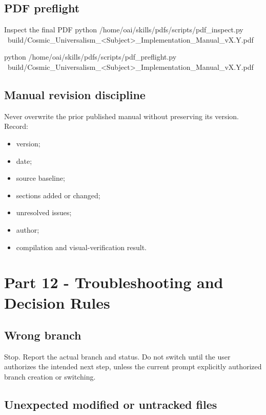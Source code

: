 \documentclass[11pt,letterpaper]{article}
\begin{document}
\subsection{PDF preflight}

\begin{commandbox}{Inspect the final PDF}
python /home/oai/skills/pdfs/scripts/pdf_inspect.py \
  build/Cosmic_Universalism_<Subject>_Implementation_Manual_vX.Y.pdf

python /home/oai/skills/pdfs/scripts/pdf_preflight.py \
  build/Cosmic_Universalism_<Subject>_Implementation_Manual_vX.Y.pdf
\end{commandbox}

\subsection{Manual revision discipline}

Never overwrite the prior published manual without preserving its version.
Record:

\begin{itemize}
    \item version;
    \item date;
    \item source baseline;
    \item sections added or changed;
    \item unresolved issues;
    \item author;
    \item compilation and visual-verification result.
\end{itemize}

\section{Part 12 - Troubleshooting and Decision Rules}

\subsection{Wrong branch}

Stop. Report the actual branch and status. Do not switch until the user
authorizes the intended next step, unless the current prompt explicitly
authorized branch creation or switching.

\subsection{Unexpected modified or untracked files}
\end{document}
